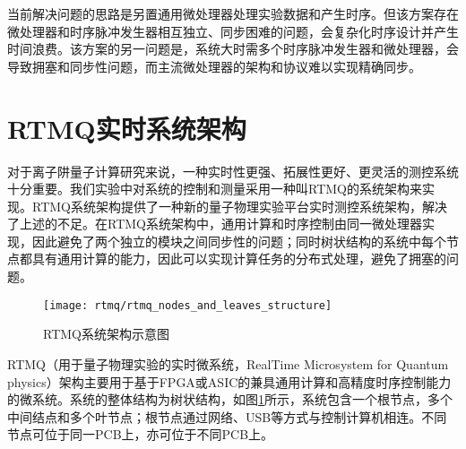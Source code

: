 当前解决问题的思路是另置通用微处理器处理实验数据和产生时序。但该方案存在微处理器和时序脉冲发生器相互独立、同步困难的问题，会复杂化时序设计并产生时间浪费。该方案的另一问题是，系统大时需多个时序脉冲发生器和微处理器，会导致拥塞和同步性问题，而主流微处理器的架构和协议难以实现精确同步。


\section[RTMQ实时系统架构]{RTMQ实时系统架构}

对于离子阱量子计算研究来说，一种实时性更强、拓展性更好、更灵活的测控系统十分重要。我们实验中对系统的控制和测量采用一种叫RTMQ的系统架构来实现。RTMQ系统架构提供了一种新的量子物理实验平台实时测控系统架构，解决了上述的不足。在RTMQ系统架构中，通用计算和时序控制由同一微处理器实现，因此避免了两个独立的模块之间同步性的问题；同时树状结构的系统中每个节点都具有通用计算的能力，因此可以实现计算任务的分布式处理，避免了拥塞的问题\cite[]{junhua01}。

\begin{figure}
    \centering
    \caption[RTMQ系统架构示意图]{RTMQ系统架构示意图\label{fig:rtmq_nodes_and_leaves_structure}}
    \texttt{[image: rtmq/rtmq\_nodes\_and\_leaves\_structure]}
\end{figure}

RTMQ（用于量子物理实验的实时微系统，RealTime Microsystem for Quantum physics）架构主要用于基于FPGA或ASIC的兼具通用计算和高精度时序控制能力的微系统。系统的整体结构为树状结构，如图\ref{fig:rtmq_nodes_and_leaves_structure}所示，系统包含一个根节点，多个中间结点和多个叶节点；根节点通过网络、USB等方式与控制计算机相连。不同节点可位于同一PCB上，亦可位于不同PCB上。

